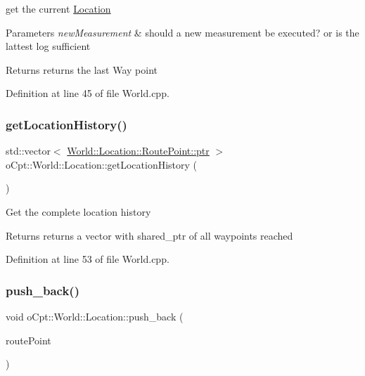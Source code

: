 get the current \hyperlink{classo_cpt_1_1_world_1_1_location}{Location} 
\begin{DoxyParams}{Parameters}
{\em new\+Measurement} & should a new measurement be executed? or is the lattest log sufficient \\
\hline
\end{DoxyParams}
\begin{DoxyReturn}{Returns}
returns the last Way point 
\end{DoxyReturn}


Definition at line 45 of file World.\+cpp.

\hypertarget{classo_cpt_1_1_world_1_1_location_a4407bfcd91b7b2dd7410341521d9dcb5}{}\label{classo_cpt_1_1_world_1_1_location_a4407bfcd91b7b2dd7410341521d9dcb5} 
\subsubsection{\texorpdfstring{get\+Location\+History()}{getLocationHistory()}}
{\footnotesize\ttfamily std\+::vector$<$ \hyperlink{structo_cpt_1_1_world_1_1_location_1_1_route_point_aa042feea77cb3c1531ab4e8ecf42fbd6}{World\+::\+Location\+::\+Route\+Point\+::ptr} $>$ o\+Cpt\+::\+World\+::\+Location\+::get\+Location\+History (\begin{DoxyParamCaption}{ }\end{DoxyParamCaption})}

Get the complete location history \begin{DoxyReturn}{Returns}
returns a vector with shared\+\_\+ptr of all waypoints reached 
\end{DoxyReturn}


Definition at line 53 of file World.\+cpp.

\hypertarget{classo_cpt_1_1_world_1_1_location_aa6211993ea4e0fdf714475d22e296220}{}\label{classo_cpt_1_1_world_1_1_location_aa6211993ea4e0fdf714475d22e296220} 
\subsubsection{\texorpdfstring{push\+\_\+back()}{push\_back()}}
{\footnotesize\ttfamily void o\+Cpt\+::\+World\+::\+Location\+::push\+\_\+back (\begin{DoxyParamCaption}\item[{\hyperlink{structo_cpt_1_1_world_1_1_location_1_1_route_point_aa042feea77cb3c1531ab4e8ecf42fbd6}{Route\+Point\+::ptr}}]{route\+Point }\end{DoxyParamCaption})}

